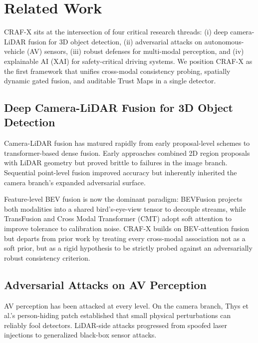 \section{Related Work}
\label{sec:related}

CRAF-X sits at the intersection of four critical research threads: (i) deep camera-LiDAR fusion for 3D object detection, (ii) adversarial attacks on autonomous-vehicle (AV) sensors, (iii) robust defenses for multi-modal perception, and (iv) explainable AI (XAI) for safety-critical driving systems. We position CRAF-X as the first framework that unifies cross-modal consistency probing, spatially dynamic gated fusion, and auditable Trust Maps in a single detector.

\subsection{Deep Camera-LiDAR Fusion for 3D Object Detection}
Camera-LiDAR fusion has matured rapidly from early proposal-level schemes \cite{KuAVOD2018} to transformer-based dense fusion. Early approaches combined 2D region proposals with LiDAR geometry but proved brittle to failures in the image branch. Sequential point-level fusion \cite{VoraPointPainting2020,HuangEPNet2020} improved accuracy but inherently inherited the camera branch's expanded adversarial surface.

Feature-level BEV fusion is now the dominant paradigm: BEVFusion \cite{LiuBEVFusion2023} projects both modalities into a shared bird's-eye-view tensor to decouple streams, while TransFusion \cite{BaiTransFusion2022} and Cross Modal Transformer (CMT) \cite{YanCMT2023} adopt soft attention to improve tolerance to calibration noise. CRAF-X builds on BEV-attention fusion but departs from prior work by treating every cross-modal association not as a soft prior, but as a rigid hypothesis to be strictly probed against an adversarially robust consistency criterion.

\subsection{Adversarial Attacks on AV Perception}
AV perception has been attacked at every level. On the camera branch, Thys et al.'s person-hiding patch \cite{ThysPatch2019} established that small physical perturbations can reliably fool detectors. LiDAR-side attacks progressed from spoofed laser injections \cite{CaoAdvLiDAR2019} to generalized black-box sensor attacks. 

